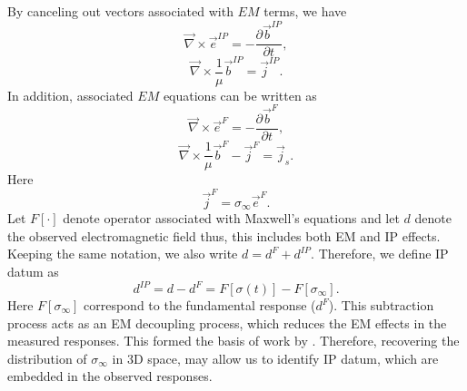 \documentclass[a4paper, 11pt]{article}
\newcommand{\curl}{{\vec \nabla}\times}
\newcommand{\siginf}{\sigma_\infty}
\renewcommand {\j}  { {\vec j} }
\renewcommand {\b}  { {\vec b} }
\newcommand {\e}  { {\vec e} }
\newcommand{\dip}{d^{IP}}
\begin{document}
By canceling out vectors associated with $EM$ terms, we have
\begin{equation}
  \curl \e^{IP} = -\frac{\partial \b^{IP}}{\partial t},
  \label{eq: eq_secondary_farad}
\end{equation}
\begin{equation}
  \curl{\frac{1}{\mu}\b^{IP}} = \j^{IP}.
  \label{eq: eq_secondary_coulomb}
\end{equation}
In addition, associated $EM$ equations can be written as
\begin{equation}
  \curl \e^{F} = -\frac{\partial \b^{F}}{\partial t},
  \label{eq: eq_primary_farad}
\end{equation}
\begin{equation}
  \curl{\frac{1}{\mu}\b^{F}} -\j^{F} = \j_s.
  \label{eq: eq_primary_coulomb}
\end{equation}
Here
\begin{equation}
  \j^{F} = \siginf\e^{F}.
  \label{eq: jF}
\end{equation}
Let $F[\cdot]$ denote operator associated with Maxwell’s equations and let $d$ denote the observed electromagnetic field thus, this includes both EM and IP effects. Keeping the same notation, we also write $d = d^{F} + \dip$. Therefore, we define IP datum as
\begin{equation}
  \dip = d - d^{F} = F[\sigma(t)]-F[\siginf].
    \label{eq: IPdatum_syn}
\end{equation}
Here $F[\siginf]$ correspond to the fundamental response ($d^F$). 
This subtraction process acts as an EM decoupling process, which reduces the EM effects in the measured responses. 
This formed the basis of work by \cite{routh2001}. 
Therefore, recovering the distribution of $\siginf$ in 3D space, may allow us to identify  IP datum, which are embedded in the observed responses. 

\end{document}
